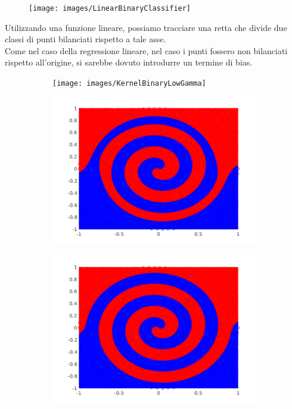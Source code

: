 \documentclass[12pt]{article}
\begin{document}
\begin{figure}[H]
  \centering
  \texttt{[image: images/LinearBinaryClassifier]}
\end{figure}
Utilizzando una funzione lineare, possiamo tracciare una retta
che divide due classi di punti bilanciati rispetto a tale asse. \\
Come nel caso della regressione lineare, nel caso i punti fossero non bilanciati
rispetto all'origine, si sarebbe dovuto introdurre un termine di bias.
\newpage
\begin{figure}[H]
  \centering
  \begin{subfigure}{0.30\textwidth}
    \texttt{[image: images/KernelBinaryLowGamma]}
  \end{subfigure}
  \begin{subfigure}{0.30\textwidth}
    \includegraphics[width=\textwidth]{images/KernelBinaryMidGamma}
  \end{subfigure}
  \begin{subfigure}{0.30\textwidth}
    \includegraphics[width=\textwidth]{images/KernelBinaryHighGamma}
  \end{subfigure}
\end{figure}
\end{document}
